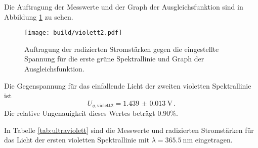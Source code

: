 Die Auftragung der Messwerte und der Graph der Ausgleichsfunktion sind in Abbildung \ref{fig:violett2} zu sehen.

\begin{figure}
  \centering
  \texttt{[image: build/violett2.pdf]}
  \caption{Auftragung der radizierten Stromstärken gegen die eingestellte Spannung für die erste grüne Spektrallinie und Graph der Ausgleichsfunktion.}
  \label{fig:violett2}
\end{figure}

Die Gegenspannung für das einfallende Licht der zweiten violetten Spektrallinie ist
\begin{equation*}
  U_{g,\text{violett2}} = \SI{1.439(0013)}{\volt}\,.
\end{equation*}
Die relative Ungenauigkeit dieses Wertes beträgt 0.90\%.

In Tabelle \ref{tab:ultraviolett} sind die Messwerte und radizierten Stromstärken
für das Licht der ersten violetten Spektrallinie mit $\lambda = \SI{365.5}{\nano\meter}$
eingetragen.

